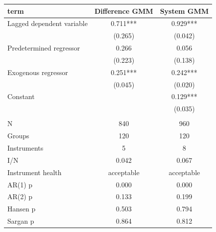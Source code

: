 \begin{tabular}{lcc}
\toprule
term & Difference GMM & System GMM \\
\midrule
Lagged dependent variable & 0.711*** & 0.929*** \\
 & (0.265) & (0.042) \\
Predetermined regressor & 0.266 & 0.056 \\
 & (0.223) & (0.138) \\
Exogenous regressor & 0.251*** & 0.242*** \\
 & (0.045) & (0.020) \\
Constant &  & 0.129*** \\
 &  & (0.035) \\
 &  &  \\
N & 840 & 960 \\
Groups & 120 & 120 \\
Instruments & 5 & 8 \\
I/N & 0.042 & 0.067 \\
Instrument health & acceptable & acceptable \\
AR(1) p & 0.000 & 0.000 \\
AR(2) p & 0.133 & 0.199 \\
Hansen p & 0.503 & 0.794 \\
Sargan p & 0.864 & 0.812 \\
\bottomrule
\end{tabular}